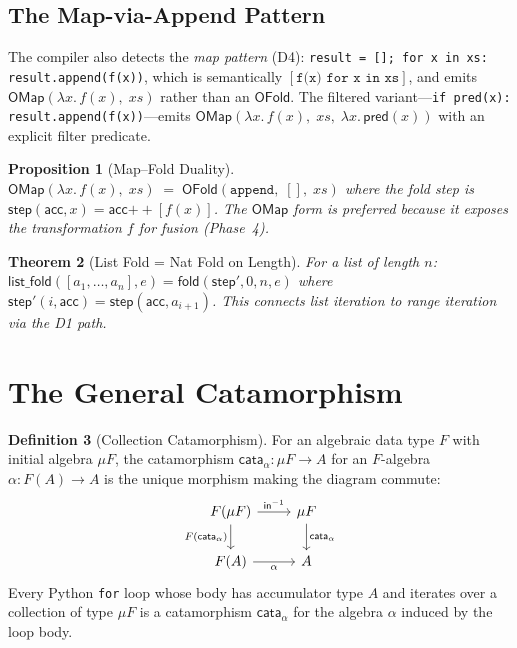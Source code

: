 \documentclass[11pt,a4paper]{report}
\theoremstyle{definition}
\newtheorem{definition}{Definition}[chapter]
\theoremstyle{plain}
\newtheorem{theorem}[definition]{Theorem}
\newtheorem{proposition}[definition]{Proposition}
\newcommand{\fold}{\mathsf{fold}}
\newcommand{\cata}{\mathsf{cata}}
\begin{document}
\subsection{The Map-via-Append Pattern}

The compiler also detects the \emph{map pattern} (D4):
\texttt{result = []; for x in xs: result.append(f(x))}, which is
semantically $[\texttt{f(x) for x in xs}]$, and emits
$\mathsf{OMap}(\lambda x.\, f(x),\; xs)$ rather than an $\mathsf{OFold}$.
The filtered variant---\texttt{if pred(x): result.append(f(x))}---emits
$\mathsf{OMap}(\lambda x.\, f(x),\; xs,\; \lambda x.\,\mathsf{pred}(x))$
with an explicit filter predicate.

\begin{proposition}[Map--Fold Duality]
$\mathsf{OMap}(\lambda x.\, f(x),\; xs) \;=\;
  \mathsf{OFold}(\texttt{append},\; [],\; xs)$
where the fold step is
$\mathsf{step}(\mathsf{acc}, x) = \mathsf{acc} \mathbin{+\!\!+} [f(x)]$.
The $\mathsf{OMap}$ form is preferred because it exposes the
transformation $f$ for fusion (Phase~4).
\end{proposition}

\begin{theorem}[List Fold = Nat Fold on Length]
For a list of length $n$: $\mathsf{list\_fold}([a_1,\ldots,a_n], e)
= \fold(\mathsf{step}', 0, n, e)$ where $\mathsf{step}'(i, \mathsf{acc})
= \mathsf{step}(\mathsf{acc}, a_{i+1})$.  This connects list iteration
to range iteration via the D1 path.
\end{theorem}

\section{The General Catamorphism}

\begin{definition}[Collection Catamorphism]
\label{def:collection-cata}
For an algebraic data type $F$ with initial algebra $\mu F$, the
catamorphism $\cata_\alpha : \mu F \to A$ for an $F$-algebra
$\alpha : F(A) \to A$ is the unique morphism making the diagram commute:
\[
\begin{tikzcd}
  F(\mu F) \ar[r, "\mathsf{in}^{-1}"] \ar[d, "F(\cata_\alpha)"'] &
    \mu F \ar[d, "\cata_\alpha"] \\
  F(A) \ar[r, "\alpha"'] & A
\end{tikzcd}
\]
Every Python \texttt{for} loop whose body has accumulator type $A$
and iterates over a collection of type $\mu F$ is a catamorphism
$\cata_\alpha$ for the algebra $\alpha$ induced by the loop body.
\end{definition}
\end{document}

